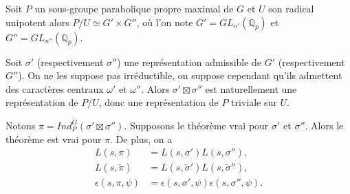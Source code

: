 Soit $P$ un sous-groupe parabolique propre maximal de $G$ et $U$ son radical unipotent alors $P/U \simeq G' \times G''$, où l'on note $G'=GL_{n'}(\mathbb{Q}_p)$ et $G''=GL_{n''}(\mathbb{Q}_p)$.

Soit $\sigma'$ (respectivement $\sigma''$) une représentation admissible de $G'$ (respectivement $G''$). On ne les suppose pas irréductible, on suppose cependant qu'ils admettent des caractères centraux $\omega'$ et $\omega''$. Alors $\sigma' \boxtimes \sigma''$ est naturellement une représentation de $P/U$, donc une représentation de $P$ triviale sur $U$.
\begin{proposition}
\label{comp_ind2}
Notons $\pi = Ind_P^G(\sigma' \boxtimes \sigma'')$. Supposons le théorème vrai pour $\sigma'$ et $\sigma''$. Alors le théorème est vrai pour $\pi$. De plus, on a
\begin{align}
L(s,\pi)&=L(s,\sigma')L(s,\sigma''), \\
L(s,\tilde{\pi})&=L(s,\tilde{\sigma}')L(s,\tilde{\sigma}''), \\
\epsilon(s,\pi,\psi)&=\epsilon(s,\sigma',\psi)\epsilon(s,\sigma'',\psi).
\end{align}
\end{proposition}

